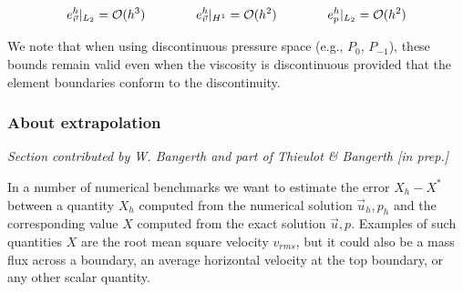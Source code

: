 \begin{equation}
e_{\vec v}^h|_{L_2} = {\cal O}(h^3)
\quad\quad\quad\quad
e_{\vec v}^h|_{H^1} = {\cal O}(h^2)
\quad\quad\quad\quad
e_{p}^h|_{L_2} = {\cal O}(h^2)
\end{equation}

We note that when using discontinuous pressure space
(e.g., $P_0$, $P_{-1}$), these bounds remain valid even
when the viscosity is discontinuous provided that the element boundaries conform to the discontinuity.

 
\subsubsection{About extrapolation}\label{ss:extrapolation}

{\it Section contributed by W. Bangerth and part of Thieulot \& Bangerth [in prep.]}

In a number of numerical benchmarks we
want to estimate the error $X_h-X^\ast$ between a quantity $X_h$ computed
from the numerical solution $\vec{u}_h,p_h$ and the corresponding value
$X$ computed from the exact solution $\vec{u},p$. Examples of such quantities
$X$ are the root mean square velocity $v_{rms}$, but it could also be a mass flux
across a boundary, an average horizontal velocity at the top boundary, or
any other scalar quantity.

